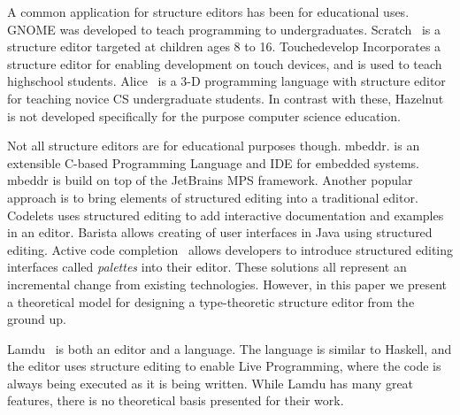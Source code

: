 \documentclass{llncs}
\begin{document}
A common application for structure editors has been for educational uses.
GNOME\cite{garlan_gnome:_1984} was developed to teach programming to undergraduates.
Scratch~\cite{Resnick:2009:SP:1592761.1592779} is a structure editor targeted at children ages 8 to 16.
Touchedevelop \cite{tillmann_touchdevelop:_2011} Incorporates a structure editor for enabling development on touch devices, and is used to teach highschool students.
Alice~\cite{Conway:2000:ALL:332040.332481} is a 3-D programming language with structure editor for teaching novice CS undergraduate students.
In contrast with these, Hazelnut is not developed specifically for the purpose computer science education.

Not all structure editors are for educational purposes though.
mbeddr. \cite{voelter_mbeddr:_2012} is an extensible C-based Programming Language and IDE for embedded systems.
mbeddr is build on top of the JetBrains MPS framework.
Another popular approach is to bring elements of structured editing into a traditional editor.
Codelets \cite{oney_codelets:_2012} uses structured editing to add interactive documentation and examples in an editor.
Barista\cite{ko_barista:_2006} allows creating of user interfaces in Java using structured editing.
Active code completion~\cite{Omar:2012:ACC:2337223.2337324} allows developers to introduce structured editing interfaces called  \emph{palettes} into their editor.
These solutions all represent an incremental change from existing technologies.  However, in this paper we present a theoretical model for designing a type-theoretic structure editor from the ground up.

Lamdu~\cite{lamdu} is both an editor and a language. The language is similar to Haskell, and the editor uses structure editing to enable Live Programming, where the code is always being executed as it is being written.
While Lamdu has many great features, there is no theoretical basis presented for their work.







%
%

\end{document}
